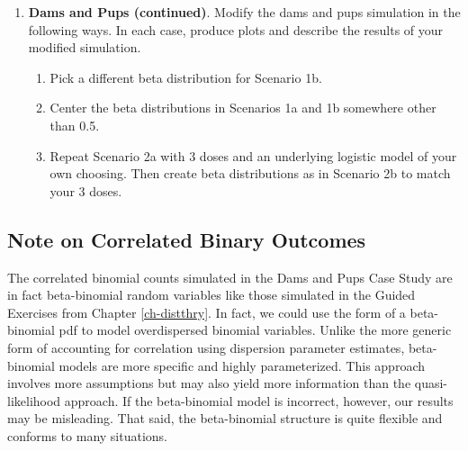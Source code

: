\documentclass[
]{krantz}
\providecommand{\tightlist}{%
  \setlength{\itemsep}{0pt}\setlength{\parskip}{0pt}}
\begin{document}
\begin{enumerate}
\def\labelenumi{\arabic{enumi}.}
\setcounter{enumi}{1}
\item
  \textbf{Dams and Pups (continued)}. Modify the dams and pups simulation in the following ways. In each case, produce plots and describe the results of your modified simulation.

  \begin{enumerate}
  \def\labelenumii{\alph{enumii}.}
  \tightlist
  \item
    Pick a different beta distribution for Scenario 1b.
  \item
    Center the beta distributions in Scenarios 1a and 1b somewhere other than 0.5.
  \item
    Repeat Scenario 2a with 3 doses and an underlying logistic model of your own choosing. Then create beta distributions as in Scenario 2b to match your 3 doses.
  \end{enumerate}
\end{enumerate}

\hypertarget{note-on-correlated-binary-outcomes}{%
\subsection{Note on Correlated Binary Outcomes}\label{note-on-correlated-binary-outcomes}}

The correlated binomial counts simulated in the Dams and Pups Case Study are in fact beta-binomial random variables like those simulated in the Guided Exercises from Chapter \ref{ch-distthry}. In fact, we could use the form of a beta-binomial pdf to model overdispersed binomial variables. Unlike the more generic form of accounting for correlation using dispersion parameter estimates, beta-binomial models are more specific and highly parameterized. This approach involves more assumptions but may also yield more information than the quasi-likelihood approach. If the beta-binomial model is incorrect, however, our results may be misleading. That said, the beta-binomial structure is quite flexible and conforms to many situations.

  

\backmatter
\printindex
\end{document}
